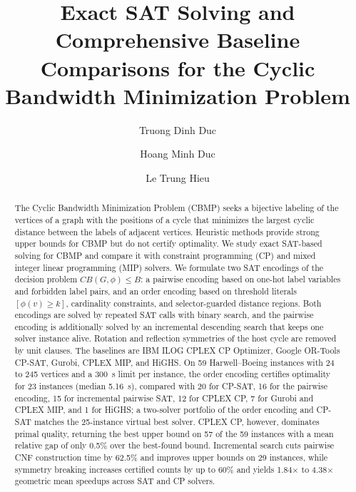 \documentclass[a4paper,fleqn]{cas-sc}
\begin{document}
\let\WriteBookmarks\relax
\def\floatpagepagefraction{1}
\def\textpagefraction{.001}


\title[mode = title]{Exact SAT Solving and Comprehensive Baseline Comparisons for the Cyclic Bandwidth Minimization Problem}

\author[1]{Truong Dinh Duc}

\author[1]{Hoang Minh Duc}

\author[1]{Le Trung Hieu}
\cormark[1]

\address[1]{Faculty of Information Technology, VNU University of Engineering and Technology, 144 Xuan Thuy, Cau Giay Ward, Hanoi, 100000, Vietnam}


\begin{abstract}
The Cyclic Bandwidth Minimization Problem (CBMP) seeks a bijective labeling of the vertices of a graph with the positions of a cycle that minimizes the largest cyclic distance between the labels of adjacent vertices. Heuristic methods provide strong upper bounds for CBMP but do not certify optimality. We study exact SAT-based solving for CBMP and compare it with constraint programming (CP) and mixed integer linear programming (MIP) solvers. We formulate two SAT encodings of the decision problem $CB(G,\phi)\le B$: a pairwise encoding based on one-hot label variables and forbidden label pairs, and an order encoding based on threshold literals $[\phi(v)\ge k]$, cardinality constraints, and selector-guarded distance regions. Both encodings are solved by repeated SAT calls with binary search, and the pairwise encoding is additionally solved by an incremental descending search that keeps one solver instance alive. Rotation and reflection symmetries of the host cycle are removed by unit clauses. The baselines are IBM ILOG CPLEX CP Optimizer, Google OR-Tools CP-SAT, Gurobi, CPLEX MIP, and HiGHS. On 59 Harwell--Boeing instances with 24 to 245 vertices and a 300~s limit per instance, the order encoding certifies optimality for 23 instances (median 5.16~s), compared with 20 for CP-SAT, 16 for the pairwise encoding, 15 for incremental pairwise SAT, 12 for CPLEX CP, 7 for Gurobi and CPLEX MIP, and 1 for HiGHS; a two-solver portfolio of the order encoding and CP-SAT matches the 25-instance virtual best solver. CPLEX CP, however, dominates primal quality, returning the best upper bound on 57 of the 59 instances with a mean relative gap of only 0.5\% over the best-found bound. Incremental search cuts pairwise CNF construction time by 62.5\% and improves upper bounds on 29 instances, while symmetry breaking increases certified counts by up to 60\% and yields 1.84$\times$ to 4.38$\times$ geometric mean speedups across SAT and CP solvers.
\end{abstract}
\end{document}
